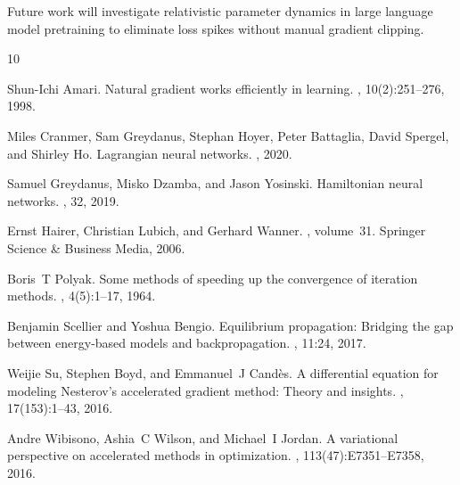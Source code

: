 \documentclass[10pt,twocolumn]{article}
\begin{document}
Future work will investigate relativistic parameter dynamics in large language model pretraining to eliminate loss spikes without manual gradient clipping.

\begin{thebibliography}{10}

Shun-Ichi Amari.
\newblock Natural gradient works efficiently in learning.
, 10(2):251--276, 1998.

Miles Cranmer, Sam Greydanus, Stephan Hoyer, Peter Battaglia, David Spergel, and Shirley Ho.
\newblock Lagrangian neural networks.
, 2020.

Samuel Greydanus, Misko Dzamba, and Jason Yosinski.
\newblock Hamiltonian neural networks.
, 32, 2019.

Ernst Hairer, Christian Lubich, and Gerhard Wanner.
, volume~31.
\newblock Springer Science \& Business Media, 2006.

Boris~T Polyak.
\newblock Some methods of speeding up the convergence of iteration methods.
, 4(5):1--17, 1964.

Benjamin Scellier and Yoshua Bengio.
\newblock Equilibrium propagation: Bridging the gap between energy-based models and backpropagation.
, 11:24, 2017.

Weijie Su, Stephen Boyd, and Emmanuel~J Cand{\`e}s.
\newblock A differential equation for modeling {N}esterov's accelerated gradient method: Theory and insights.
, 17(153):1--43, 2016.

Andre Wibisono, Ashia~C Wilson, and Michael~I Jordan.
\newblock A variational perspective on accelerated methods in optimization.
, 113(47):E7351--E7358, 2016.

\end{thebibliography}
\end{document}

